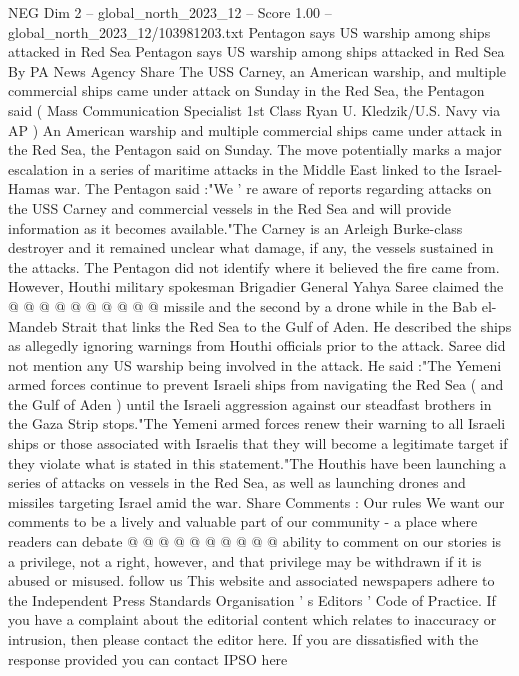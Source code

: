 \begin{textsample}{NEG Dim 2 – global\_north\_2023\_12 – Score 1.00 – global\_north\_2023\_12/103981203.txt}  \label{ex:f2_neg_334}
Pentagon says US warship among ships attacked in Red Sea Pentagon says US warship among ships attacked in Red Sea By PA News Agency Share The USS Carney, an American warship, and multiple commercial ships came under attack on Sunday in the Red Sea, the Pentagon said ( Mass Communication Specialist 1st Class Ryan U.
Kledzik/U.S.
Navy via AP ) An American warship and multiple commercial ships came under attack in the Red Sea, the Pentagon said on Sunday.
The move potentially marks a major escalation in a series of maritime attacks in the Middle East linked to the Israel-Hamas war.
The Pentagon said :"We ' re aware of reports regarding attacks on the USS Carney and commercial vessels in the Red Sea and will provide information as it becomes available."The Carney is an Arleigh Burke-class destroyer and it remained unclear what damage, if any, the vessels sustained in the attacks.
The Pentagon did not identify where it believed the fire came from.
However, Houthi military spokesman Brigadier General Yahya Saree claimed the @ @ @ @ @ @ @ @ @ @ missile and the second by a drone while in the Bab el-Mandeb Strait that links the Red Sea to the Gulf of Aden.
He described the ships as allegedly ignoring warnings from Houthi officials prior to the attack.
Saree did not mention any US warship being involved in the attack.
He said :"The Yemeni armed forces continue to prevent Israeli ships from navigating the Red Sea ( and the Gulf of Aden ) until the Israeli aggression against our steadfast brothers in the Gaza Strip stops."The Yemeni armed forces renew their warning to all Israeli ships or those associated with Israelis that they will become a legitimate target if they violate what is stated in this statement."The Houthis have been launching a series of attacks on vessels in the Red Sea, as well as launching drones and missiles targeting Israel amid the war.
Share Comments : Our rules We want our comments to be a lively and valuable part of our community - a place where readers can debate @ @ @ @ @ @ @ @ @ @ ability to comment on our stories is a privilege, not a right, however, and that privilege may be withdrawn if it is abused or misused. follow us This website and associated newspapers adhere to the Independent Press Standards Organisation ' s Editors ' Code of Practice.
If you have a complaint about the editorial content which relates to inaccuracy or intrusion, then please contact the editor here.
If you are dissatisfied with the response provided you can contact IPSO here

\end{textsample}
